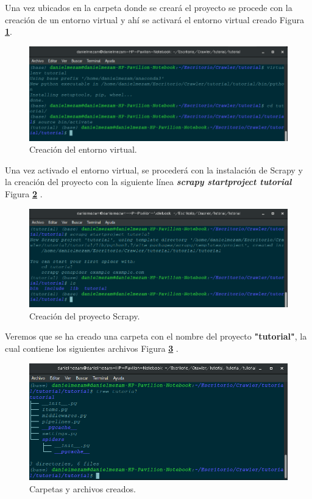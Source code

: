 Una vez ubicados en la carpeta donde se creará el proyecto se procede con la creación de un entorno virtual y ahí se activará el entorno virtual 
creado Figura \textbf{\ref{fig:dos}}.

\begin{figure}[H]
    \centering
    \includegraphics[scale=.35]{imagenes/Capitulo5/2}
    \caption{Creación del entorno virtual.}
    \label{fig:dos}
  \end{figure}

Una vez activado el entorno virtual, se procederá con la instalación de Scrapy y la creación del proyecto con la siguiente línea
\textbf{\textit{scrapy startproject tutorial}} Figura \textbf{\ref{fig:tres}} .

\begin{figure}[H]
    \centering
    \includegraphics[scale=.35]{imagenes/Capitulo5/3}
    \caption{Creación del proyecto Scrapy.}
    \label{fig:tres}
  \end{figure}

Veremos que se ha creado una carpeta con el nombre del proyecto \textbf{"tutorial"}, la cual contiene los siguientes archivos Figura \textbf{\ref{fig:cuatro}} .

\begin{figure}[H]
    \centering
    \includegraphics[scale=.35]{imagenes/Capitulo5/4}
    \caption{Carpetas y archivos creados.}
    \label{fig:cuatro}
  \end{figure}
 
